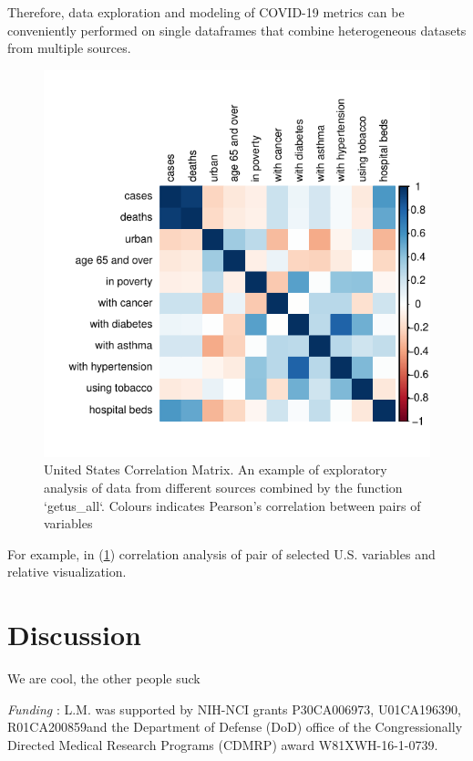 \documentclass[12pt,halfline,a4paper,]{ouparticle}
\begin{document}
Therefore, data exploration and modeling of COVID-19 metrics can be
conveniently performed on single dataframes that combine heterogeneous
datasets from multiple sources.

\begin{figure}[p]
\includegraphics[width=1\linewidth]{draft_files/figure-latex/fig_corr-1} \caption{United States Correlation Matrix. An example of exploratory analysis of data from different sources combined by the function `getus\_all`. Colours indicates Pearson's correlation between pairs of variables}\label{fig:fig_corr}
\end{figure}

For example, in (\ref{fig:fig_corr}) correlation analysis of pair of
selected U.S. variables and relative visualization.

\hypertarget{discussion}{%
\section{Discussion}\label{discussion}}

We are cool, the other people suck


\begin{notes}[Acknowledgements]
\emph{Funding} : L.M. was supported by NIH-NCI grants P30CA006973,
U01CA196390, R01CA200859and the Department of Defense (DoD) office of
the Congressionally Directed Medical Research Programs (CDMRP) award
W81XWH-16-1-0739.
\end{notes}


\renewcommand\refname{References}


\end{document}
